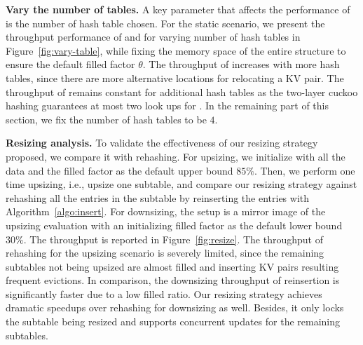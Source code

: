 \vspace{1mm}
\noindent\textbf{Vary the number of tables.}
A key parameter that affects the performance of \voter is the number of hash table chosen. For the static scenario, we present the throughput performance of  and  for varying number of hash tables in Figure~\ref{fig:vary-table}, while fixing the memory space of the entire structure to ensure the default filled factor $\theta$. 
The throughput of  increases with more hash tables, since there are more alternative locations for relocating a KV pair. 
The throughput of  remains constant for additional hash tables as the two-layer cuckoo hashing guarantees at most two look ups for . In the remaining part of this section, we fix the number of hash tables to be $4$.

\vspace{1mm}
\noindent\textbf{Resizing analysis.}
To validate the effectiveness of our resizing strategy proposed, we compare it with rehashing. 
For upsizing, we initialize \voter with all the data and the filled factor as the default upper bound $85\%$. Then, we perform one time upsizing, i.e., upsize one subtable, and compare our resizing strategy against rehashing all the entries in the subtable by reinserting the entries with Algorithm~\ref{algo:insert}.
For downsizing, the setup is a mirror image of the upsizing evaluation with an initializing filled factor as the default lower bound $30\%$. 
The throughput is reported in Figure~\ref{fig:resize}. 
The throughput of rehashing for the upsizing scenario is severely limited, since the remaining subtables not being upsized are almost filled and inserting KV pairs resulting frequent evictions.  
In comparison, the downsizing throughput of reinsertion is significantly faster due to a low filled ratio.
Our resizing strategy achieves dramatic speedups over rehashing for downsizing as well. Besides, it only locks the subtable being resized and supports concurrent updates for the remaining subtables. 

